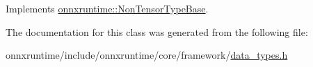 Implements \mbox{\hyperlink{classonnxruntime_1_1NonTensorTypeBase_ab81811ddad81a55603074f90c4297d56}{onnxruntime\+::\+Non\+Tensor\+Type\+Base}}.



The documentation for this class was generated from the following file\+:\begin{DoxyCompactItemize}
\item 
onnxruntime/include/onnxruntime/core/framework/\mbox{\hyperlink{data__types_8h}{data\+\_\+types.\+h}}\end{DoxyCompactItemize}
